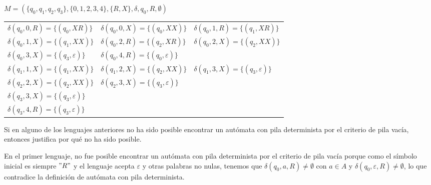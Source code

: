 \documentclass[a4paper, 11pt]{article}
\begin{document}
\begin{enumerate}
\begin{enumerate}
		$M=(\{ q_0, q_1, q_2, q_3 \}, \{ 0, 1, 2, 3, 4 \}, \{ R, X\}, \delta, q_0, R, \emptyset)$
		\begin{center}
			\begin{tabular}{l l l}
				$\delta(q_0, 0, R)=\{ (q_0, XR) \}$ & $\delta(q_0, 0, X)=\{ (q_0, XX) \}$ & $\delta(q_0, 1, R)=\{ (q_1, XR) \}$ \\
				$\delta(q_0, 1, X)=\{ (q_1, XX) \}$ & $\delta(q_0, 2, R)=\{ (q_2, XR) \}$ &  $\delta(q_0, 2, X)=\{ (q_2, XX) \}$ \\
				$\delta(q_0, 3, X)=\{ (q_3, \varepsilon) \}$ & $\delta(q_0, 4, R)=\{ (q_0, \varepsilon) \}$ & \\
				$\delta(q_1, 1, X)=\{ (q_1, XX) \}$ & $\delta(q_1, 2, X)=\{ (q_2, XX) \}$ & $\delta(q_1, 3, X)=\{ (q_3, \varepsilon) \}$ \\
				$\delta(q_2, 2, X)=\{ (q_2, XX) \}$ & $\delta(q_2, 3, X)=\{ (q_3, \varepsilon) \}$ & \\
				$\delta(q_3, 3, X)=\{ (q_3, \varepsilon) \}$ & & \\
				$\delta(q_3, 4, R)=\{ (q_3, \varepsilon) \}$ & & \\
			\end{tabular}
		\end{center}
	\end{enumerate}
	
	Si en alguno de los lenguajes anteriores no ha sido posible encontrar un autómata con pila
	determinista por el criterio de pila vacía, entonces justifica por qué no ha sido posible.
	
	En el primer lenguaje, no fue posible encontrar un autómata con pila determinista por el
	criterio de pila vacía porque como el símbolo inicial es siempre $"R"$ y el lenguaje acepta
	$\varepsilon$ y otras palabras no nulas, tenemos que $\delta(q_0,a,R) \neq \emptyset$ con
	$a \in A$ y $\delta(q_0,\varepsilon,R) \neq \emptyset$, lo que contradice la definición de
	autómata con pila determinista.
\end{enumerate}
\end{document}
